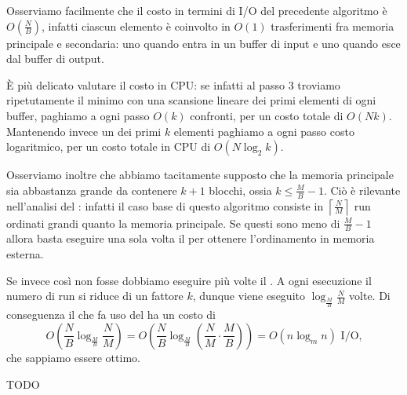 Osserviamo facilmente che il costo in termini di I/O del precedente algoritmo
è \(O\left(\frac{N}{B}\right)\), infatti ciascun elemento \`e coinvolto in 
\(O\left(1\right)\) trasferimenti fra memoria principale e secondaria: uno 
quando entra in un buffer di input e uno quando esce dal buffer di output.

\`E pi\`u delicato valutare il costo in CPU: se infatti al passo \(3\)
troviamo ripetutamente il minimo con una scansione lineare dei primi elementi
di ogni buffer, paghiamo a ogni passo \(O(k)\) confronti, per un costo totale
di \(O(Nk)\). Mantenendo invece un \minheap dei primi \(k\) elementi 
paghiamo a ogni passo costo logaritmico, per un costo totale in CPU di 
\(O(N\log_{2}{k})\).

Osserviamo inoltre che abbiamo tacitamente supposto che la memoria principale 
sia abbastanza grande da contenere \(k+1\) blocchi, ossia \(k \le \frac{M}{B} 
- 1\). Ci\`o \`e rilevante nell'analisi del \mergesort: infatti il caso base 
di questo algoritmo consiste in \(\left\lceil\frac{N}{M}\right\rceil\)
run ordinati grandi quanto la memoria principale. Se questi sono meno di 
\(\frac{M}{B} - 1\) allora basta eseguire una sola volta il \kwaymerge
per ottenere l'ordinamento in memoria esterna.

Se invece cos\`i non fosse dobbiamo eseguire pi\`u volte il \kwaymerge.
A ogni esecuzione il numero di run si riduce di un fattore \(k\), dunque
viene eseguito \(\log_{\frac{M}{B}}{\frac{N}{M}}\) volte. Di conseguenza il 
\mergesort che fa uso del \kwaymerge ha un costo di
\[O\left(\frac{N}{B}\log_{\frac{M}{B}}{\frac{N}{M}}\right) = 
O\left(\frac{N}{B}\log_{\frac{M}{B}}{\left(\frac{N}{M}\cdot\frac{M}{B}\right)}
\right) = O\left(n\log_{m}{n}\right)\mbox{ I/O,}\] che sappiamo essere ottimo.

TODO
